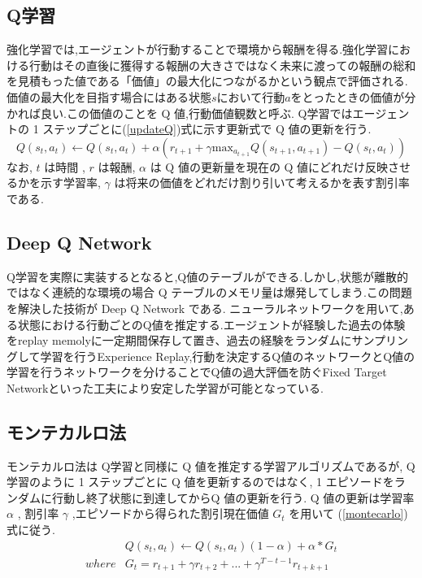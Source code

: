 \documentclass[twocolumn]{jarticle}     %
\begin{document}
\subsection{Q学習}
強化学習では,エージェントが行動することで環境から報酬を得る.強化学習における行動はその直後に獲得する報酬の大きさではなく未来に渡っての報酬の総和を見積もった値である「価値」の最大化につながるかという観点で評価される.
価値の最大化を目指す場合にはある状態$s$において行動$a$をとったときの価値が分かれば良い.この価値のことを Q 値,行動価値観数と呼ぶ.
Q学習ではエージェントの 1 ステップごとに(\ref{updateQ})式に示す更新式で Q 値の更新を行う.
\begin{equation}
  \label{updateQ}
  Q(s_t,a_t) \leftarrow  Q(s_t,a_t) + \alpha(r_{t+1} + \gamma \mathrm{max}_{a_{t+1}}Q(s_{t+1},a_{t+1}) - Q(s_t,a_t))
\end{equation}
なお, $t$ は時間 , $r$ は報酬, $\alpha$ は Q 値の更新量を現在の Q 値にどれだけ反映させるかを示す学習率, $\gamma$ は将来の価値をどれだけ割り引いて考えるかを表す割引率である\cite{緑本}.

\subsection{Deep Q Network}
Q学習を実際に実装するとなると,Q値のテーブルができる.しかし,状態が離散的ではなく連続的な環境の場合 Q テーブルのメモリ量は爆発してしまう.この問題を解決した技術が Deep Q Network である.
ニューラルネットワークを用いて,ある状態における行動ごとのQ値を推定する.エージェントが経験した過去の体験をreplay memolyに一定期間保存して置き、過去の経験をランダムにサンプリングして学習を行うExperience Replay,行動を決定するQ値のネットワークとQ値の学習を行うネットワークを分けることでQ値の過大評価を防ぐFixed Target Networkといった工夫により安定した学習が可能となっている\cite{DQN}.

\subsection{モンテカルロ法}
モンテカルロ法は Q学習と同様に Q 値を推定する学習アルゴリズムであるが, Q 学習のように 1 ステップごとに Q 値を更新するのではなく, 1 エピソードをランダムに行動し終了状態に到達してからQ 値の更新を行う. Q 値の更新は学習率 $\alpha$ , 割引率 $\gamma$ ,エピソードから得られた割引現在価値 $G_t$ を用いて (\ref{montecarlo}) 式に従う\cite{緑本}.
\begin{eqnarray}
  \label{montecarlo}
  &Q(s_t,a_t) \leftarrow Q(s_t,a_t)(1 - \alpha) + \alpha * G_{t} \\
  where  &G_t = r_{t+1} + \gamma r_{t+2} + ... + \gamma^{T-t-1} r_{t+k+1} \nonumber
\end{eqnarray}
\end{document}
